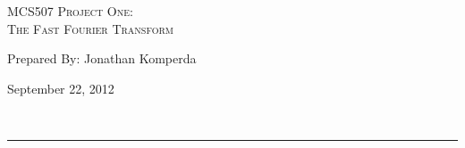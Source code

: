 \begin{center}
\textsc{\Large MCS507 Project One:\\}
\textsc{The Fast Fourier Transform}
\end{center}
\begin{minipage}{0.4\textwidth}
\begin{flushleft}
	Prepared By: Jonathan Komperda
\end{flushleft}
\end{minipage}
\begin{minipage}{0.59\textwidth}
\begin{flushright}
	September 22, 2012
\end{flushright}
\end{minipage}\\[0.01in]
\hrule